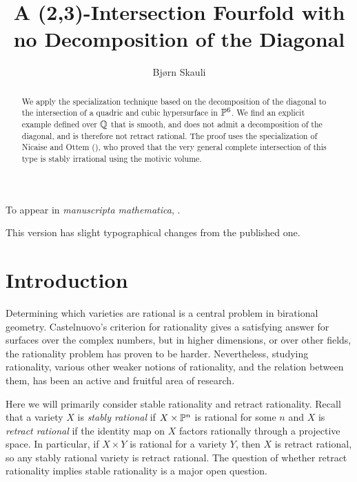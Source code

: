 \title{A (2,3)-Intersection Fourfold with no Decomposition of the Diagonal}
\author{Bjørn Skauli}
\metadata
{
    To appear in \emph{manuscripta mathematica},
    .
    
    This version has slight typographical changes from the published one.
}
\maketitle
\label{pap:23diagonal}
\startcontents[chapters]

\begin{abstract}
We apply the specialization technique based on the decomposition of the diagonal to the intersection of a quadric and cubic hypersurface in $\P^6$. We find an explicit example defined over $\Q$ that is smooth, and does not admit a decomposition of the diagonal, and is therefore not retract rational. The proof uses the specialization of Nicaise and Ottem (\cite{NicaiseOttem}), who proved that the very general complete intersection of this type is stably irrational using the motivic volume.
\end{abstract}

\section{Introduction}
Determining which varieties are rational is a central problem in birational geometry. Castelnuovo's criterion for rationality gives a satisfying answer for surfaces over the complex numbers, but in higher dimensions, or over other fields, the rationality problem has proven to be harder. Nevertheless, studying rationality, various other weaker notions of rationality, and the relation between them, has been an active and fruitful area of research.

Here we will primarily consider stable rationality and retract rationality. Recall that a variety $X$ is \emph{stably rational} if $X \times \P^n$ is rational for some $n$ and $X$ is \emph{retract rational} if the identity map on $X$ factors rationally through a projective space. In particular, if $X \times Y$ is rational for a variety $Y$, then $X$ is retract rational, so any stably rational variety is retract rational. The question of whether retract rationality implies stable rationality is a major open question. 

